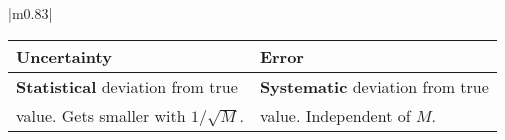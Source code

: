 \documentclass{article}
\begin{document}
\begin{minipage}[t][18cm][c]{13cm}
    \centering

    \begin{tabular}{|m{}|}    
        \hline
        \begin{tabular}{l|l}
            \textbf{Uncertainty} & \textbf{Error} \\
            \hline
            \textbf{Statistical} deviation from true
            & \textbf{Systematic} deviation from true\\
             value. Gets smaller with $1/\sqrt{M}$. 
            &  value. Independent of $M$. \\
        \end{tabular}\\
        
        \hline
        

\end{tabular}
\end{minipage}
\end{document}

